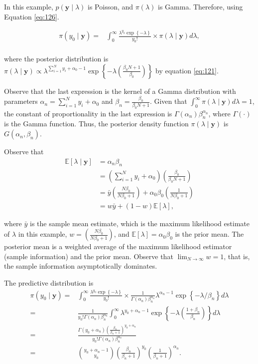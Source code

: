 In this example, \( p(\mathbf{y} \mid \lambda) \) is Poisson, and \( \pi(\lambda) \) is Gamma. Therefore, using Equation \ref{eq:126}.


\begin{align*}
	\pi(y_0\mid \mathbf{y})=&\int_{0}^{\infty}\frac{\lambda^{y_0}\exp\left\{-\lambda\right\}}{y_0!}\times \pi(\lambda\mid \mathbf{y})d\lambda,\\
\end{align*}

where the posterior distribution is $\pi(\lambda\mid \mathbf{y})\propto \lambda^{\sum_{i=1}^N y_i + \alpha_0 - 1}\exp\left\{-\lambda\left(\frac{\beta_0 N+1}{\beta_0}\right)\right\}$ by equation \ref{eq:121}.

Observe that the last expression is the kernel of a Gamma distribution with parameters \( \alpha_n = \sum_{i=1}^N y_i + \alpha_0 \) and \( \beta_n = \frac{\beta_0}{\beta_0 N + 1} \). Given that \( \int_0^{\infty} \pi(\lambda \mid \mathbf{y}) d\lambda = 1 \), the constant of proportionality in the last expression is \( \Gamma(\alpha_n) \beta_n^{\alpha_n} \), where \( \Gamma(\cdot) \) is the Gamma function. Thus, the posterior density function \( \pi(\lambda \mid \mathbf{y}) \) is \( G(\alpha_n, \beta_n) \).

Observe that 
\begin{align*}
	\mathbb{E}[\lambda\mid \mathbf{y}]&=\alpha_n\beta_n\\
	&=\left(\sum_{i=1}^N y_i + \alpha_0\right)\left(\frac{\beta_0}{\beta_0 N + 1}\right)\\
	&=\bar{y}\left(\frac{N\beta_0}{N\beta_0+1}\right)+\alpha_0\beta_0\left(\frac{1}{N\beta_0+1}\right)\\
	&=w\bar{y}+(1-w)\mathbb{E}[\lambda],
\end{align*}

where \( \bar{y} \) is the sample mean estimate, which is the maximum likelihood estimate of \( \lambda \) in this example, \( w = \left(\frac{N\beta_0}{N\beta_0 + 1}\right) \), and \( \mathbb{E}[\lambda] = \alpha_0 \beta_0 \) is the prior mean. The posterior mean is a weighted average of the maximum likelihood estimator (sample information) and the prior mean. Observe that \( \lim_{N \to \infty} w = 1 \), that is, the sample information asymptotically dominates.

The predictive distribution is
\begin{align*}
	\pi(y_0\mid \mathbf{y})=&\int_{0}^{\infty}\frac{\lambda^{y_0}\exp\left\{-\lambda\right\}}{y_0!}\times \frac{1}{\Gamma(\alpha_n)\beta_n^{\alpha_n}}\lambda^{\alpha_n-1}\exp\left\{-\lambda/\beta_n\right\} d\lambda\\
	=&\frac{1}{y_0!\Gamma(\alpha_n)\beta_n^{\alpha_n}}\int_{0}^{\infty}\lambda^{y_0+\alpha_n-1}\exp\left\{-\lambda\left(\frac{1+\beta_n}{\beta_n}\right)\right\}d\lambda\\
	=&\frac{\Gamma(y_0+\alpha_n)\left(\frac{\beta_n}{\beta_n+1}\right)^{y_0+\alpha_n}}{y_0!\Gamma(\alpha_n)\beta_n^{\alpha_n}}\\
	=&{y_0+\alpha_n-1 \choose y_0}\left(\frac{\beta_n}{\beta_n+1}\right)^{y_0}\left(\frac{1}{\beta_n+1}\right)^{\alpha_n}.
\end{align*}

